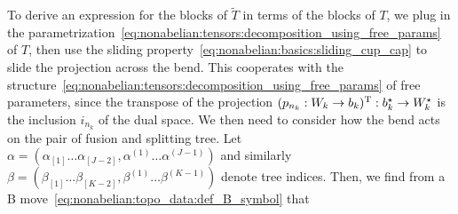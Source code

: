 To derive an expression for the blocks of $\tilde{T}$ in terms of the blocks of $T$, we
plug in the parametrization~\eqref{eq:nonabelian:tensors:decomposition_using_free_params} of $T$, then use the sliding property~\eqref{eq:nonabelian:basics:sliding_cup_cap} to slide the projection across the bend.
%
This cooperates with the structure~\eqref{eq:nonabelian:tensors:decomposition_using_free_params} of free parameters, since the transpose of the projection $(p_{n_k}: W_k \to b_k)^{\text{T}} : b_k^\star \to W_k^\star$ is the inclusion $i_{n_k}$ of the dual space.
%
We then need to consider how the bend acts on the pair of fusion and splitting tree.
%
Let $\alpha = (\alpha_{[1]} \dots \alpha_{[J-2]}, \alpha^{(1)} \dots \alpha^{(J-1)})$ and similarly $\beta = (\beta_{[1]} \dots \beta_{[K-2]}, \beta^{(1)} \dots \beta^{(K-1)})$ denote tree indices.
%
Then, we find from a B move~\eqref{eq:nonabelian:topo_data:def_B_symbol} that


